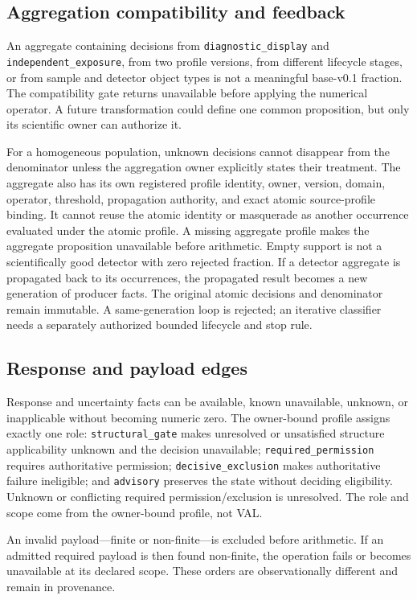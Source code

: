 \subsection{Aggregation compatibility and feedback}

An aggregate containing decisions from
\texttt{diagnostic\_display} and
\texttt{independent\_exposure}, from two profile versions, from different
lifecycle stages, or from sample and detector object types is not a meaningful
base-v0.1 fraction. The compatibility gate returns unavailable before
applying the numerical operator. A future transformation could define one
common proposition, but only its scientific owner can authorize it.

For a homogeneous population, unknown decisions cannot disappear from the
denominator unless the aggregation owner explicitly states their treatment.
The aggregate also has its own registered profile identity, owner, version,
domain, operator, threshold, propagation authority, and exact atomic
source-profile binding. It cannot reuse the atomic identity or masquerade as
another occurrence evaluated under the atomic profile. A missing aggregate
profile makes the aggregate proposition unavailable before arithmetic.
Empty support is not a scientifically good detector with zero rejected
fraction. If a detector aggregate is propagated back to its occurrences, the
propagated result becomes a new generation of producer facts. The original
atomic decisions and denominator remain immutable. A same-generation loop is
rejected; an iterative classifier needs a separately authorized bounded
lifecycle and stop rule.

\subsection{Response and payload edges}

Response and uncertainty facts can be available, known unavailable, unknown,
or inapplicable without becoming numeric zero. The owner-bound profile assigns
exactly one role: \texttt{structural\_gate} makes unresolved or unsatisfied
structure applicability unknown and the decision unavailable;
\texttt{required\_permission} requires authoritative permission;
\texttt{decisive\_exclusion} makes authoritative failure ineligible; and
\texttt{advisory} preserves the state without deciding eligibility. Unknown or
conflicting required permission/exclusion is unresolved. The role and scope
come from the owner-bound profile, not VAL.

An invalid payload---finite or non-finite---is excluded before arithmetic. If
an admitted required payload is then found non-finite, the operation fails or
becomes unavailable at its declared scope. These orders are observationally
different and remain in provenance.
